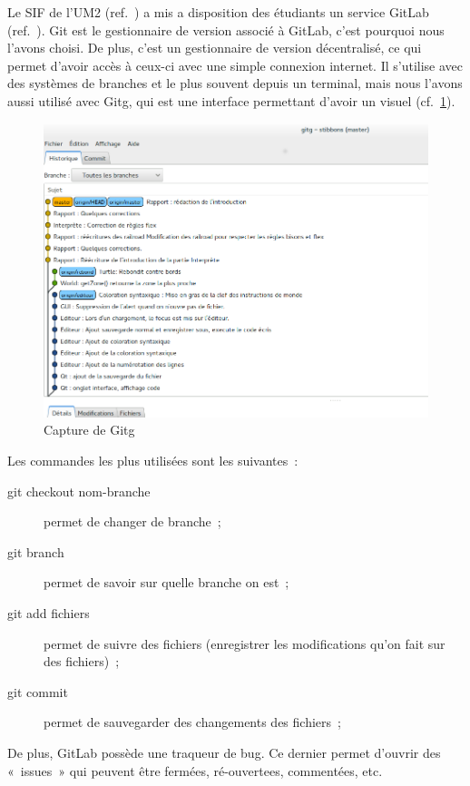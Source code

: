 Le SIF de l'UM2 (ref.~\cite{GitLabSIF}) a mis a disposition des étudiants un service GitLab (ref.~\cite{GitLab}). Git est le gestionnaire de version associé à GitLab, c'est pourquoi nous l'avons choisi.
De plus, c'est un gestionnaire de version décentralisé, ce qui permet d'avoir accès à ceux-ci avec une simple connexion internet.
Il s'utilise avec des systèmes de branches et le plus souvent depuis un terminal, mais nous l'avons aussi utilisé avec Gitg, qui est une interface permettant d'avoir un visuel (cf.~\ref{gitg}).

\begin{figure}[h]
\caption{\label{gitg} Capture de Gitg}
\includegraphics[scale=0.35]{doc/report/uml/gitbranche.png}
\end{figure}

Les commandes les plus utilisées sont les suivantes~:
\begin{description}
\item[git checkout nom-branche] permet de changer de branche~;
\item[git branch] permet de savoir sur quelle branche on est~;
\item[git add fichiers] permet de suivre des fichiers (enregistrer les modifications qu'on fait sur des fichiers)~;
\item[git commit] permet de sauvegarder des changements des fichiers~;
\end{description}

De plus, GitLab possède une traqueur de bug. Ce dernier permet d'ouvrir des «~issues~» qui peuvent être fermées, ré-ouvertees, commentées, etc.
